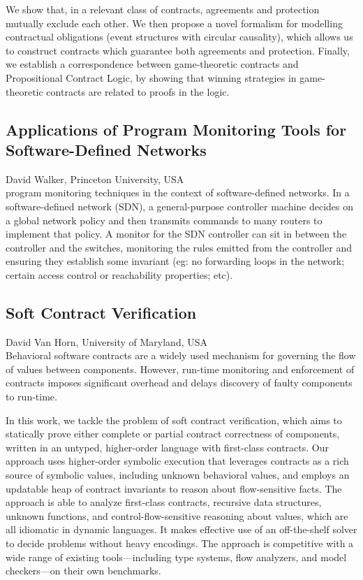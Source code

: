 \documentclass[11pt]{article}
\begin{document}
We show that, in a relevant class of contracts, agreements and
protection mutually exclude each other. We then propose a novel
formalism for modelling contractual obligations (event structures with
circular causality), which allows us to construct contracts which
guarantee both agreements and protection. Finally, we establish a
correspondence between game-theoretic contracts and Propositional
Contract Logic, by showing that winning strategies in game-theoretic
contracts are related to proofs in the logic.

\subsection*{Applications of Program Monitoring Tools for Software-Defined Networks}
\noindent David Walker, Princeton University, USA \\[0.5ex]

program monitoring techniques in the context of software-defined
networks.  In a software-defined network (SDN), a general-purpose
controller machine decides on a global network policy and then
transmits commands to many routers to implement that policy.  A
monitor for the SDN controller can sit in between the controller and
the switches, monitoring the rules emitted from the controller and
ensuring they establish some invariant (eg: no forwarding loops in the
network; certain access control or reachability properties; etc).

\subsection*{Soft Contract Verification}
\noindent David Van Horn, University of Maryland, USA \\[0.5ex]

Behavioral software contracts are a widely used mechanism for
governing the flow of values between components. However, run-time
monitoring and enforcement of contracts imposes significant overhead
and delays discovery of faulty components to run-time.

In this work, we tackle the problem of soft contract verification,
which aims to statically prove either complete or partial contract
correctness of components, written in an untyped, higher-order
language with first-class contracts. Our approach uses higher-order
symbolic execution that leverages contracts as a rich source of
symbolic values, including unknown behavioral values, and employs an
updatable heap of contract invariants to reason about flow-sensitive
facts. The approach is able to analyze first-class contracts,
recursive data structures, unknown functions, and
control-flow-sensitive reasoning about values, which are all idiomatic
in dynamic languages. It makes effective use of an off-the-shelf
solver to decide problems without heavy encodings. The approach is
competitive with a wide range of existing tools---including type
systems, flow analyzers, and model checkers---on their own benchmarks.
\end{document}
